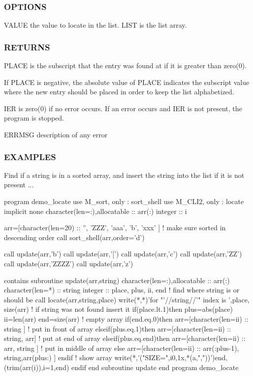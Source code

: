 \subsubsection*{O\+P\+T\+I\+O\+NS}

\begin{DoxyVerb}VALUE         the value to locate in the list.
LIST          is the list array.
\end{DoxyVerb}


\subsubsection*{R\+E\+T\+U\+R\+NS}

P\+L\+A\+CE is the subscript that the entry was found at if it is greater than zero(0).

If P\+L\+A\+CE is negative, the absolute value of P\+L\+A\+CE indicates the subscript value where the new entry should be placed in order to keep the list alphabetized.

I\+ER is zero(0) if no error occurs. If an error occurs and I\+ER is not present, the program is stopped.

E\+R\+R\+M\+SG description of any error

\subsubsection*{E\+X\+A\+M\+P\+L\+ES}

Find if a string is in a sorted array, and insert the string into the list if it is not present ... \begin{DoxyVerb}program demo_locate
use M_sort, only : sort_shell
use M_CLI2, only : locate
implicit none
character(len=:),allocatable  :: arr(:)
integer                       :: i

arr=[character(len=20) :: '', 'ZZZ', 'aaa', 'b', 'xxx' ]
! make sure sorted in descending order
call sort_shell(arr,order='d')

call update(arr,'b')
call update(arr,'[')
call update(arr,'c')
call update(arr,'ZZ')
call update(arr,'ZZZZ')
call update(arr,'z')

contains
subroutine update(arr,string)
character(len=:),allocatable :: arr(:)
character(len=*)             :: string
integer                      :: place, plus, ii, end
! find where string is or should be
call locate(arr,string,place)
write(*,*)'for "'//string//'" index is ',place, size(arr)
! if string was not found insert it
if(place.lt.1)then
   plus=abs(place)
   ii=len(arr)
   end=size(arr)
   ! empty array
   if(end.eq.0)then
      arr=[character(len=ii) :: string ]
   ! put in front of array
   elseif(plus.eq.1)then
      arr=[character(len=ii) :: string, arr]
   ! put at end of array
   elseif(plus.eq.end)then
      arr=[character(len=ii) :: arr, string ]
   ! put in middle of array
   else
      arr=[character(len=ii) :: arr(:plus-1), string,arr(plus:) ]
   endif
   ! show array
   write(*,'("SIZE=",i0,1x,*(a,","))')end,(trim(arr(i)),i=1,end)
endif
end subroutine update
end program demo_locate
\end{DoxyVerb}


